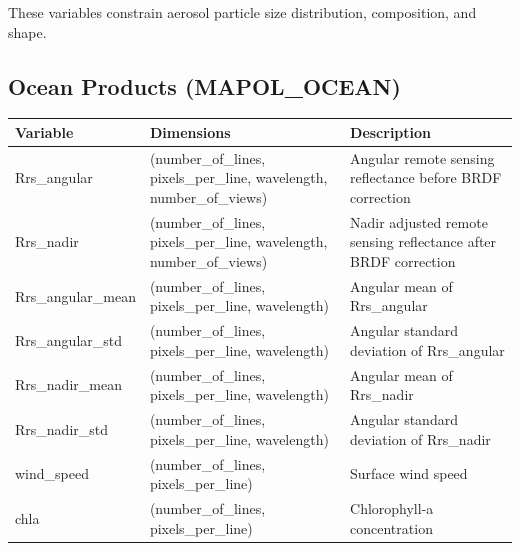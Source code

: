 \documentclass[
  11pt,
  letterpaper,
  DIV=11,
  numbers=noendperiod]{scrreprt}
\begin{document}
These variables constrain aerosol particle size distribution,
composition, and shape.

\subsection{Ocean Products
(MAPOL\_OCEAN)}\label{ocean-products-mapol_ocean}

\begin{longtable}[]{@{}
  >{\raggedright\arraybackslash}p{}
  >{\raggedright\arraybackslash}p{}
  >{\raggedright\arraybackslash}p{}@{}}
\toprule\noalign{}
\begin{minipage}[b]{\linewidth}\raggedright
Variable
\end{minipage} & \begin{minipage}[b]{\linewidth}\raggedright
Dimensions
\end{minipage} & \begin{minipage}[b]{\linewidth}\raggedright
Description
\end{minipage} \\
\midrule\noalign{}
\endhead
\bottomrule\noalign{}
\endlastfoot
Rrs\_angular & (number\_of\_lines, pixels\_per\_line, wavelength,
number\_of\_views) & Angular remote sensing reflectance before BRDF
correction \\
Rrs\_nadir & (number\_of\_lines, pixels\_per\_line, wavelength,
number\_of\_views) & Nadir adjusted remote sensing reflectance after
BRDF correction \\
Rrs\_angular\_mean & (number\_of\_lines, pixels\_per\_line, wavelength)
& Angular mean of Rrs\_angular \\
Rrs\_angular\_std & (number\_of\_lines, pixels\_per\_line, wavelength) &
Angular standard deviation of Rrs\_angular \\
Rrs\_nadir\_mean & (number\_of\_lines, pixels\_per\_line, wavelength) &
Angular mean of Rrs\_nadir \\
Rrs\_nadir\_std & (number\_of\_lines, pixels\_per\_line, wavelength) &
Angular standard deviation of Rrs\_nadir \\
wind\_speed & (number\_of\_lines, pixels\_per\_line) & Surface wind
speed \\
chla & (number\_of\_lines, pixels\_per\_line) & Chlorophyll-a
concentration \\
\end{longtable}
\end{document}
